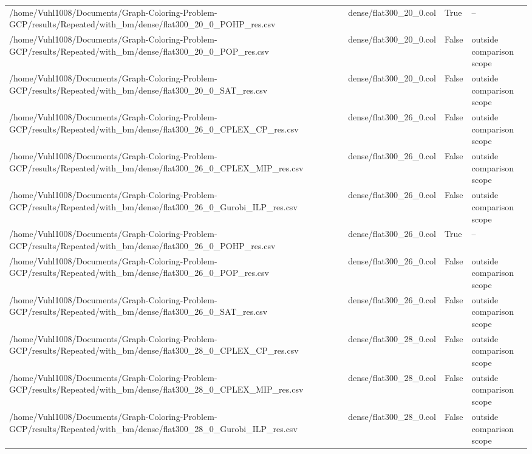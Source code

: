 \begin{table}[htbp]
\begin{tabular}{llll}
/home/Vuhl1008/Documents/Graph-Coloring-Problem-GCP/results/Repeated/with\_bm/dense/flat300\_20\_0\_POHP\_res.csv & dense/flat300\_20\_0.col & True & -- \\
/home/Vuhl1008/Documents/Graph-Coloring-Problem-GCP/results/Repeated/with\_bm/dense/flat300\_20\_0\_POP\_res.csv & dense/flat300\_20\_0.col & False & outside comparison scope \\
/home/Vuhl1008/Documents/Graph-Coloring-Problem-GCP/results/Repeated/with\_bm/dense/flat300\_20\_0\_SAT\_res.csv & dense/flat300\_20\_0.col & False & outside comparison scope \\
/home/Vuhl1008/Documents/Graph-Coloring-Problem-GCP/results/Repeated/with\_bm/dense/flat300\_26\_0\_CPLEX\_CP\_res.csv & dense/flat300\_26\_0.col & False & outside comparison scope \\
/home/Vuhl1008/Documents/Graph-Coloring-Problem-GCP/results/Repeated/with\_bm/dense/flat300\_26\_0\_CPLEX\_MIP\_res.csv & dense/flat300\_26\_0.col & False & outside comparison scope \\
/home/Vuhl1008/Documents/Graph-Coloring-Problem-GCP/results/Repeated/with\_bm/dense/flat300\_26\_0\_Gurobi\_ILP\_res.csv & dense/flat300\_26\_0.col & False & outside comparison scope \\
/home/Vuhl1008/Documents/Graph-Coloring-Problem-GCP/results/Repeated/with\_bm/dense/flat300\_26\_0\_POHP\_res.csv & dense/flat300\_26\_0.col & True & -- \\
/home/Vuhl1008/Documents/Graph-Coloring-Problem-GCP/results/Repeated/with\_bm/dense/flat300\_26\_0\_POP\_res.csv & dense/flat300\_26\_0.col & False & outside comparison scope \\
/home/Vuhl1008/Documents/Graph-Coloring-Problem-GCP/results/Repeated/with\_bm/dense/flat300\_26\_0\_SAT\_res.csv & dense/flat300\_26\_0.col & False & outside comparison scope \\
/home/Vuhl1008/Documents/Graph-Coloring-Problem-GCP/results/Repeated/with\_bm/dense/flat300\_28\_0\_CPLEX\_CP\_res.csv & dense/flat300\_28\_0.col & False & outside comparison scope \\
/home/Vuhl1008/Documents/Graph-Coloring-Problem-GCP/results/Repeated/with\_bm/dense/flat300\_28\_0\_CPLEX\_MIP\_res.csv & dense/flat300\_28\_0.col & False & outside comparison scope \\
/home/Vuhl1008/Documents/Graph-Coloring-Problem-GCP/results/Repeated/with\_bm/dense/flat300\_28\_0\_Gurobi\_ILP\_res.csv & dense/flat300\_28\_0.col & False & outside comparison scope \\

\end{tabular}
\end{table}

